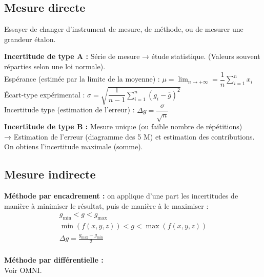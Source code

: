 \documentclass[13pt, twoside, a4paper, french]{report}
\begin{document}
    \begin{minipage}[t]{0.65\textwidth}%
      \subsection{Mesure directe}\label{subsec:mesure-directe}
        
        Essayer de changer d'instrument de mesure, de méthode, ou de mesurer une grandeur étalon.
        
        \textbf{Incertitude de type A :} Série de mesure → étude statistique. (Valeurs souvent réparties selon une loi normale).\\
        Espérance (estimée par la limite de la moyenne) : $\displaystyle \mu = \lim_{n \to +\infty} = \dfrac{1}{n} \sum_{i=1}^{n} x_i$\\
        Écart-type expérimental : $\displaystyle \sigma = \sqrt{\dfrac{1}{n-1} \sum_{i=1}^{n} (g_i - \overline{g})^2}$\\
        Incertitude type (estimation de l'erreur) : $\Delta g = \dfrac{\sigma}{\sqrt{n}}$\\
        
        \textbf{Incertitude de type B :} Mesure unique (ou faible nombre de répétitions)\\
        → Estimation de l'erreur (diagramme des 5 M) et estimation des contributions.\\
        On obtiens l'incertitude maximale (somme).
    
    \end{minipage}\hspace{0.03\textwidth}
    \begin{minipage}[t]{0.32\textwidth}%
      \subsection{Mesure indirecte}\label{subsec:mesure-indirecte}
        
        \textbf{Méthode par encadrement :} on applique d'une part les incertitudes de manière à minimiser le résultat, puis de manière à le maximiser :
        \begin{gather*}
          g_{\min} < g < g_{\max}\\
          \min(f(x, y, z)) < g < \max(f(x, y, z))\\
          \Delta g = \frac{g_{\max} - g_{\min}}{2}\\
        \end{gather*}
        
        \textbf{Méthode par différentielle :}\\ Voir OMNI.
    
    \end{minipage}
\end{document}
